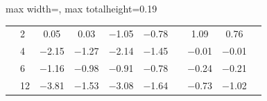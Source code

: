\begin{table}[htbp]
{\begin{adjustbox}{max width=\linewidth, max totalheight=0.19\textheight}
\begin{tabular}{llcccccccc}
 & 2 & \phantom{$-$}0.05 & \phantom{$-$}0.03 & $-$1.05 & $-$0.78 &  & \phantom{$-$}1.09 & \phantom{$-$}0.76 &  \\
 & 4 & $-$2.15 & $-$1.27 & $-$2.14 & $-$1.45 &  & $-$0.01 & $-$0.01 &  \\
 & 6 & $-$1.16 & $-$0.98 & $-$0.91 & $-$0.78 &  & $-$0.24 & $-$0.21 &  \\
 & 12 & $-$3.81 & $-$1.53 & $-$3.08 & $-$1.64 &  & $-$0.73 & $-$1.02 &  \\
\bottomrule
\end{tabular}
\end{adjustbox}
}
\end{table}

